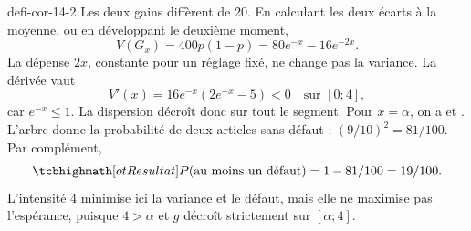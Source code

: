 \begin{blocEdition}{defi-cor-14-2}
Les deux gains diffèrent de 20. En calculant les deux écarts à la moyenne,
ou en développant le deuxième moment,
\[V(G_x)=400p(1-p)=80e^{-x}-16e^{-2x}.\]
La dépense $2x$, constante pour un réglage fixé, ne change pas la variance.
La dérivée vaut
\[V'(x)=16e^{-x}(2e^{-x}-5)<0\quad\text{sur }[0;4],\]
car $e^{-x}\leq1$. La dispersion décroît donc sur tout le segment.
Pour $x=\alpha$, on a  et .
L'arbre donne la probabilité de deux articles sans défaut : $(9/10)^2=81/100$.
Par complément,
\[\res{P(\text{au moins un défaut})=1-81/100=19/100}.\]
L'intensité 4 minimise ici la variance et le défaut, mais elle ne maximise pas l'espérance,
puisque $4>\alpha$ et $g$ décroît strictement sur $[\alpha;4]$.
\label{figedition-defi-cor-14-2-1}
\end{blocEdition}

